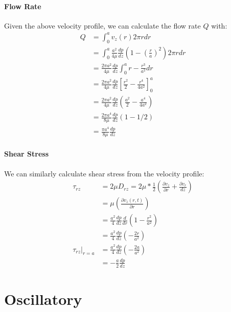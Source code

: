 \documentclass[11pt,letterpaper]{article}
\begin{document}
\paragraph{Flow Rate}
Given the above velocity profile, we can calculate the flow rate $Q$ with:
\begin{align*}
    Q &= \int_0^a v_z(r) 2 \pi r dr\\
     &= \int_0^a \frac{a^2}{4 \mu} \frac{d p}{dz} \left(1 - \left(\frac{r}{a}\right)^2 \right) 2 \pi r dr\\
     &= \frac{2 \pi a^2}{4 \mu}\frac{d p}{dz}\int_0^a r - \frac{r^3}{a^2} dr\\
     &= \frac{2 \pi a^2}{4 \mu}\frac{d p}{dz}\left[ \frac{r^2}{2} - \frac{r^4}{4 a^2} \right]_0^a\\
     &=\frac{2 \pi a^2}{4 \mu}\frac{d p}{dz}\left( \frac{a^2}{2} - \frac{a^4}{4 a^2} \right)\\
     &=\frac{2 \pi a^4}{8 \mu}\frac{d p}{dz}\left(1 - 1/2 \right) \\
     &=\frac{ \pi a^4}{8 \mu}\frac{d p}{dz}
\end{align*}
\paragraph{Shear Stress}
We can similarly calculate shear stress from the velocity profile:
\begin{align*}
    \tau_{rz} &=2 \mu D_{rz} = 2 \mu * \frac{1}{2}\left(    \frac{\partial v_z}{\partial r}   +  \frac{\partial v_r}{dz}\right)\\
            &= \mu \left(\frac{\partial v_z(r,t)}{\partial r}\right)\\
              &= \frac{a^2}{4}\frac{d p}{dz} \frac{d}{d r} \left(1 - \frac{r^2}{a^2}\right) \\
              &= \frac{a^2}{4}     \frac{d p}{dz} \left( - \frac{2 r}{a^2}\right)\\
    \left.\tau_{rz}\right|_{r = a} &= \frac{a^2}{4}     \frac{d p}{dz} \left( - \frac{2 a}{a^2}\right)\\
                                   &= - \frac{a}{2}     \frac{d p}{dz}
\end{align*}
\section*{Oscillatory}
\end{document}
